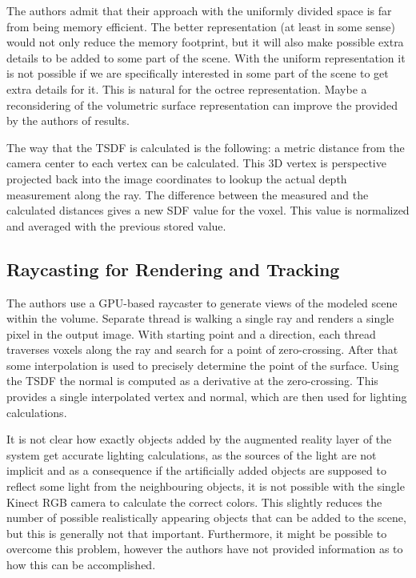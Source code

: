 \documentclass[12pt, a4paper]{article}
\theoremstyle{plain}
\begin{document}
    The authors admit that their approach with the uniformly divided space is
    far from being memory efficient. The better representation (at least in some
    sense) would not only reduce the memory footprint, but it will also make
    possible extra details to be added to some part of the scene. With the
    uniform representation it is not possible if we are specifically interested
    in some part of the scene to get extra details for it. This is natural for
    the octree representation. Maybe a reconsidering of the volumetric surface
    representation can improve the provided by the authors of
    \cite{kinectfusion} results.

    The way that the TSDF is calculated is the following: a metric distance from
    the camera center to each vertex can be calculated. This 3D vertex is
    perspective projected back into the image coordinates to lookup the actual
    depth measurement along the ray. The difference between the measured and the
    calculated distances gives a new SDF value for the voxel. This value is
    normalized and averaged with the previous stored value. 

  \subsection{Raycasting for Rendering and Tracking} %
  \label{sub:Raycasting for Rendering and Tracking}
    The authors use a GPU-based raycaster to generate views of the modeled scene
    within the volume. Separate thread is walking a single ray and renders a
    single pixel in the output image. With starting point and a direction, each
    thread traverses voxels along the ray and search for a point of
    zero-crossing. After that some interpolation is used to precisely determine
    the point of the surface. Using the TSDF the normal is computed as a
    derivative at the zero-crossing. This provides a single interpolated vertex
    and normal, which are then used for lighting calculations.

    It is not clear how exactly objects added by the augmented reality layer of
    the system get accurate lighting calculations, as the sources of the light
    are not implicit and as a consequence if the artificially added objects are
    supposed to reflect some light from the neighbouring objects, it is not
    possible with the single Kinect RGB camera to calculate the correct colors.
    This slightly reduces the number of possible realistically appearing objects
    that can be added to the scene, but this is generally not that important.
    Furthermore, it might be possible to overcome this problem, however the
    authors have not provided information as to how this can be accomplished.
\end{document}
